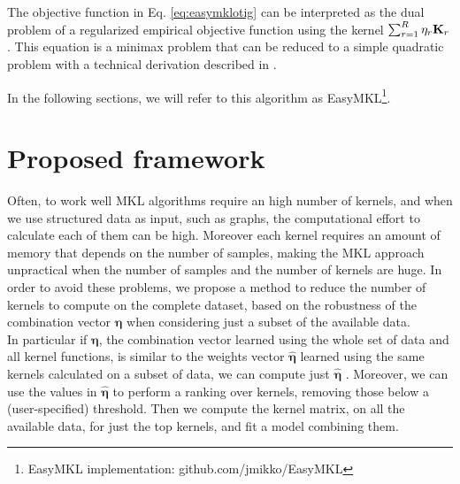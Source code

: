 \documentclass{esannV2}
\newcommand{\yy}{{\bf y}}
\newcommand{\KK}{{\bf K}}
\newcommand{\YY}{{\bf Y}}
\newcommand{\XX}{{\bf X}}
\newcommand{\1}{{\bf 1}}
\newcommand{\ggamma}{\pmb{\gamma}}
\begin{document}
The objective function in Eq. \ref{eq:easymklotig} can be interpreted as the dual problem of a regularized empirical objective function using the kernel $\sum_{r=1}^R \eta_r \KK_r$. This equation is a minimax problem that can be reduced  to a simple quadratic problem with a technical derivation described  in \cite{Aiolli2015}. %

In the following sections, we will refer to this algorithm as EasyMKL\footnote{EasyMKL implementation: github.com/jmikko/EasyMKL}.


\section{Proposed framework}
Often, to work well MKL algorithms require an high number of kernels, and when we use structured data as input, such as graphs, the computational effort to calculate each of them can be high. Moreover each kernel requires an amount of memory that depends on the number of samples, making the MKL approach unpractical when the number of samples and the number of kernels are huge.
In order to avoid these problems, we propose a method to reduce the number of kernels to compute on the complete dataset, based on the robustness of the combination vector $\boldsymbol{\eta}$ when considering just a subset of the available data.\\
In particular if $\boldsymbol{\eta}$, the combination vector learned using the whole set of data and all kernel functions, is similar to the weights vector $\hat{\boldsymbol{\eta}}$ learned using the same kernels calculated on a subset of data, we can compute just $\hat{\boldsymbol{\eta}}$ .
Moreover, we can use the values in $\hat{\boldsymbol{\eta}}$ to perform a ranking over kernels, removing those below a (user-specified) threshold.
Then we compute the kernel matrix, on all the available data, for just the top kernels, and fit a model combining them.
\end{document}
